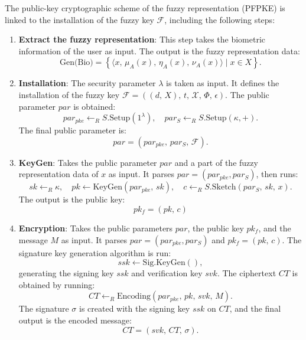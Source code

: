 \documentclass[graybox]{svmult}
\begin{document}
The public-key cryptographic scheme of the fuzzy representation (PFPKE) is linked to the installation of the fuzzy key \( \mathcal{F} \), including the following steps:

\begin{enumerate}
    \item \textbf{Extract the fuzzy representation}: This step takes the biometric information of the user as input. The output is the fuzzy representation data:
          \[
              \text{Gen(Bio)} = \left\{ \langle x,\, \mu_A(x),\, \eta_A(x),\, \nu_A(x) \rangle \mid x \in X \right\}.
          \]

    \item \textbf{Installation}: The security parameter \( \lambda \) is taken as input. It defines the \break installation of the fuzzy key \( \mathcal{F} = ((d,\, X),\, t,\, \mathcal{X},\, \varPhi,\, \epsilon) \). The public parameter \(  par \) is \allowbreak obtained:
          \[
              par_{pke} \leftarrow_R S.\text{Setup}(1^\lambda), \quad par_S \leftarrow_R S.\text{Setup}(\kappa, +).
          \]
          The final public parameter is:
          \[
              par  = (par_{pke},\, par_S,\, \mathcal{F}).
          \]

    \item \textbf{KeyGen}: Takes the public parameter \(  par \) and a part of the fuzzy representation data of \( x \) as input. It parses \( par  = (par_{pke}, par_S) \), then runs:
          \[
              sk \leftarrow_R \kappa, \quad pk \leftarrow \text{KeyGen}(par_{pke}, \, sk), \quad c \leftarrow_R S.\text{Sketch}(par_S, \, sk, \, x).
          \]
          The output is the public key:
          \[
              pk_f = (pk,\, c)
          \]

    \item \textbf{Encryption}: Takes the public parameters \(  par \), the public key \( pk_f \), and the \allowbreak message \( M \) as input. It parses \( par  = ( par_{pke}, par_S) \) and \( pk_f = (pk, \, c) \). The \allowbreak signature key generation algorithm is run:
          \[
              ssk \leftarrow \text{Sig.KeyGen}(),
          \]
          generating the signing key $ssk$ and verification key $svk$. The ciphertext $CT$ is obtained by running:
          \[
              CT \leftarrow_R \text{Encoding}(par_{pke}, \, pk, \, svk, \, M).
          \]
          The signature $\sigma$ is created with the signing key $ssk$ on $CT$, and the final output is the encoded message:
          \[
              CT = (svk, \, CT, \, \sigma).
          \]


\end{enumerate}
\end{document}
